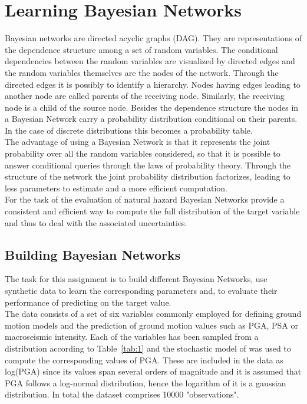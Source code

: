 
\chapter{Learning Bayesian Networks} %

\label{Chapter2} %

Bayesian networks are directed acyclic graphs (DAG). They are representations of the dependence structure among a set of random variables. The conditional dependencies between the random variables are visualized by directed edges and the random variables themselves are the nodes of the network. Through the directed edges it is possibly to identify a hierarchy. Nodes having edges leading to another node are called parents of the receiving node. Similarly, the receiving node is a child of the source node. Besides the dependence structure the nodes in a Bayesian Network carry a probability distribution conditional on their parents. In the case of discrete distributions this becomes a probability table.\\
The advantage of using a Bayesian Network is that it represents the joint probability over all the random variables considered, so that it is possible to answer conditional queries through the laws of probability theory. Through the structure of the network the joint probability distribution factorizes, leading to less parameters to estimate and a more efficient computation.\\
For the task of the evaluation of natural hazard Bayesian Networks provide a consistent and efficient way to compute the full distribution of the target variable and thus to deal with the associated uncertainties.
\newpage


\section{Building Bayesian Networks}
The task for this assignment is to build different Bayesian Networks, use synthetic data to learn the corresponding parameters and, to evaluate their performance of predicting on the target value.\\
The data consists of a set of six variables commonly employed for defining ground motion models and the prediction of ground motion values such as PGA, PSA or macroseismic intensity. Each of the variables has been sampled from a distribution according to Table~\ref{tab:1} and the stochastic model of     \cite{boore2003} was used to compute the corresponding values of PGA. These are included in the data as log(PGA) since its values span several orders of magnitude and it is assumed that PGA follows a log-normal distribution, hence the logarithm of it is a gaussian distribution. In total the dataset comprises 10000 "observations".
\vspace{1.5cm}


